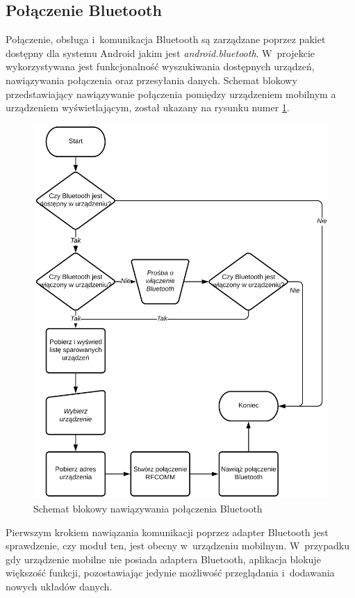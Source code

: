 \documentclass[a4paper,12pt, twoside]{article}
\begin{document}
    	\subsection{Połączenie Bluetooth}
    	Połączenie, obsługa i~komunikacja Bluetooth są zarządzane poprzez pakiet dostępny dla systemu Android jakim jest \textit{android.bluetooth}\cite{android.bluetooth}. W~projekcie wykorzystywana jest funkcjonalność wyszukiwania dostępnych urządzeń, nawiązywania połączenia oraz przesyłania danych. Schemat blokowy przedstawiający nawiązywanie połączenia pomiędzy urządzeniem mobilnym a urządzeniem wyświetlającym, został ukazany na rysunku numer \ref{fig:btconnect}. 
    	\begin{figure}[H]
    	        \centering
    			\includegraphics[width=12cm]{images/rys_12bluetoothconnection.png}
    			\caption{Schemat blokowy nawiązywania połączenia Bluetooth}
                \label{fig:btconnect}
    	\end{figure}
    	Pierwszym krokiem nawiązania komunikacji poprzez adapter Bluetooth jest sprawdzenie, czy moduł ten, jest obecny w~urządzeniu mobilnym. W~przypadku gdy urządzenie mobilne nie posiada adaptera Bluetooth, aplikacja blokuje większość funkcji, pozostawiając jedynie możliwość przeglądania i~dodawania nowych układów danych. 
    	
\end{document}
